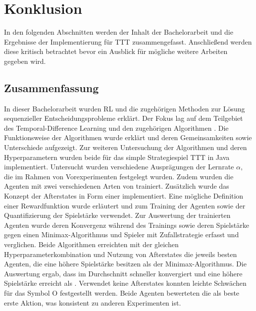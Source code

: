 \chapter{Konklusion}
In den folgenden Abschnitten werden der Inhalt der Bachelorarbeit und die Ergebnisse der Implementierung für \ac{TTT} zusammengefasst.
Anschließend werden diese kritisch betrachtet bevor ein Ausblick für mögliche weitere Arbeiten gegeben wird.

\section{Zusammenfassung}
In dieser Bachelorarbeit wurden \acl{RL} und die zugehörigen Methoden zur Lösung sequenzieller Entscheidungsprobleme erklärt. 
Der Fokus lag auf dem Teilgebiet des Temporal-Difference Learning und den zugehörigen Algorithmen \bothAlgs.
Die Funktionsweise der Algorithmen wurde erklärt und deren Gemeinsamkeiten sowie Unterschiede aufgezeigt. 
Zur weiteren Untersuchung der Algorithmen und deren Hyperparametern wurden beide für das simple Strategiespiel \acl{TTT} in Java implementiert. 
Untersucht wurden verschiedene Ausprägungen der Lernrate $\alpha$, die im Rahmen von Vorexperimenten festgelegt wurden. 
Zudem wurden die Agenten mit zwei verschiedenen Arten von \splay trainiert. 
Zusätzlich wurde das Konzept der Afterstates in Form einer \wtable implementiert. 
Eine mögliche Definition einer Rewardfunktion wurde erläutert und zum Training der Agenten sowie der Quantifizierung der Spielstärke verwendet. 
Zur Auswertung der trainierten Agenten wurde deren Konvergenz während des Trainings sowie deren Spielstärke gegen einen Minimax-Algorithmus und Spieler mit Zufallstrategie erfasst und verglichen. 
Beide Algorithmen erreichten mit der gleichen Hyperparameterkombination und Nutzung von Afterstates die jeweils besten Agenten, die eine höhere Spielstärke besitzen als der Minimax-Algorithmus. 
Die Auswertung ergab, dass \qlearning im Durchschnitt schneller konvergiert und eine höhere Spielstärke erreicht als \sarsa. 
Verwendet \sarsa keine Afterstates konnten leichte Schwächen für das Symbol O festgestellt werden. 
Beide Agenten bewerteten die  als beste erste Aktion, was konsistent zu anderen Experimenten ist.

